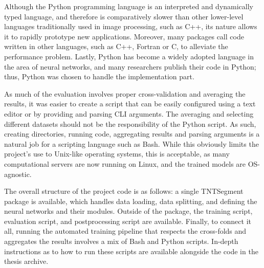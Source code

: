 \documentclass[
  digital,     %
  oneside,     %
  nosansbold,  %
  nocolorbold, %
  lof,         %
  lot,         %
]{fithesis4}
\begin{document}
Although the Python programming language is an interpreted and dynamically typed language, and therefore is comparatively slower than other lower-level languages traditionally used in image processing, such as C++, its nature allows it to rapidly prototype new applications. Moreover, many packages call code written in other languages, such as C++, Fortran or C, to alleviate the performance problem. Lastly, Python has become a widely adopted language in the area of neural networks, and many researchers publish their code in Python; thus, Python was chosen to handle the implementation part.

As much of the evaluation involves proper cross-validation and averaging the results, it was easier to create a script that can be easily configured using a text editor or by providing and parsing CLI arguments. The averaging and selecting different datasets should not be the responsibility of the Python script. As such, creating directories, running code, aggregating results and parsing arguments is a natural job for a scripting language such as Bash. While this obviously limits the project's use to Unix-like operating systems, this is acceptable, as many computational servers are now running on Linux, and the trained models are OS-agnostic.

The overall structure of the project code is as follows: a single TNTSegment package is available, which handles data loading, data splitting, and defining the neural networks and their modules. Outside of the package, the training script, evaluation script, and postprocessing script are available. Finally, to connect it all, running the automated training pipeline that respects the cross-folds and aggregates the results involves a mix of Bash and Python scripts. In-depth instructions as to how to run these scripts are available alongside the code in the thesis archive.
\end{document}
